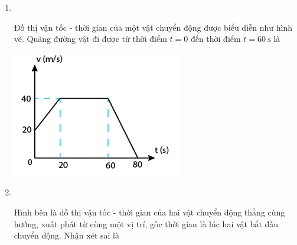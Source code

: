 \begin{enumerate}[label=\bfseries Câu \arabic*:,leftmargin=1.5cm]
\item {}\\
{\begin{minipage}[l]{0.6\textwidth}
		Đồ thị vận tốc - thời gian của một vật chuyển động được biểu diễn như hình vẽ. Quãng đường vật đi được từ thời điểm $t = 0$ đến thời điểm $t = \SI{60}{\second}$ là
	\end{minipage}
	\begin{minipage}{0.4\textwidth}
		\begin{center}
			\includegraphics[width=0.7\linewidth]{../figs/VN10-2022-PH-TP008-P-5}
		\end{center}
	\end{minipage}
}
\item {}\\
{\begin{minipage}[l]{0.6\textwidth}
		Hình bên là đồ thị vận tốc - thời gian của hai vật chuyển động thẳng cùng hướng, xuất phát từ cùng một vị trí, gốc thời gian là lúc hai vật bắt đầu chuyển động. Nhận xét sai là
\end{minipage}}
\end{enumerate}
